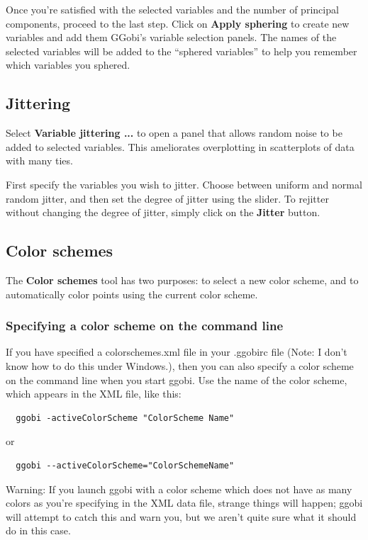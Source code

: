 \documentclass[11pt]{article}
\def\Widget#1{\textbf{#1}}
\begin{document}
Once you're satisfied with the selected variables and the number of
principal components, proceed to the last step.  Click on
\Widget{Apply sphering} to create new variables and add them GGobi's
variable selection panels.  The names of the selected variables will
be added to the ``sphered variables'' to help you remember which
variables you sphered.

\subsection{Jittering}

Select \Widget{Variable jittering ...} to open a panel that allows
random noise to be added to selected variables.  This ameliorates
overplotting in scatterplots of data with many ties.

First specify the variables you wish to jitter.  Choose between uniform
and normal random jitter, and then set the degree of jitter using the
slider.  To rejitter without changing the degree of jitter, simply click
on the \Widget{Jitter} button.

\subsection{Color schemes}
\label{slbl:ColorSchemes}

The \Widget{Color schemes} tool has two purposes: to select a
new color scheme, and to automatically color points
using the current color scheme.

\subsubsection{Specifying a color scheme on the command line}

If you have specified a colorschemes.xml file in your .ggobirc file
(Note: I don't know how to do this under Windows.),
then you can also specify a color scheme on the command line when you
start ggobi.  Use the name of the color scheme, which appears in the
XML file, like this:

\begin{verbatim}
  ggobi -activeColorScheme "ColorScheme Name"
\end{verbatim}
  or   
\begin{verbatim}
  ggobi --activeColorScheme="ColorSchemeName"
\end{verbatim}

Warning: If you launch ggobi with a color scheme which does not have
as many colors as you're specifying in the XML data file, strange
things will happen; ggobi will attempt to catch this and warn you,
but we aren't quite sure what it should do in this case.
\end{document}

